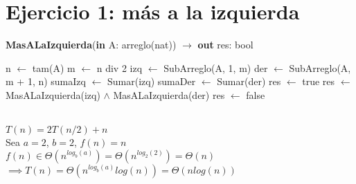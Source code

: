 \section{Ejercicio 1: más a la izquierda}

\begin{algorithm}[H]
\caption{
    \textbf{MasALaIzquierda}(\textbf{in} A: arreglo(nat)) $\to$ \textbf{out} res: bool
}
\begin{algorithmic}[1]
    \State n $\gets$ tam(A)
    \State m $\gets$ n div 2
    \State izq $\gets$ SubArreglo(A, 1, m) 
    \State der $\gets$ SubArreglo(A, m + 1, n) 
    \State sumaIzq $\gets$ Sumar(izq) 
    \State sumaDer $\gets$ Sumar(der) 
            \State res $\gets$ true
        \Else
            \State res $\gets$ MasALaIzquierda(izq) $\land$ MasALaIzquierda(der)
        \EndIf
    \Else
        \State res $\gets$ false
    \EndIf
\end{algorithmic}
\Complexity{} \\
$T(n) = 2 T(n/2) + n$ \\
Sea $a=2$, $b=2$, $f(n) = n$ \\
$f(n) \in \Theta(n^{log_b(a)}) = \Theta(n^{log_2(2)}) = \Theta(n)$ \\
$\implies T(n) = \Theta(n^{log_b(a)} log(n)) = \Theta(n log(n))$
\end{algorithm}
